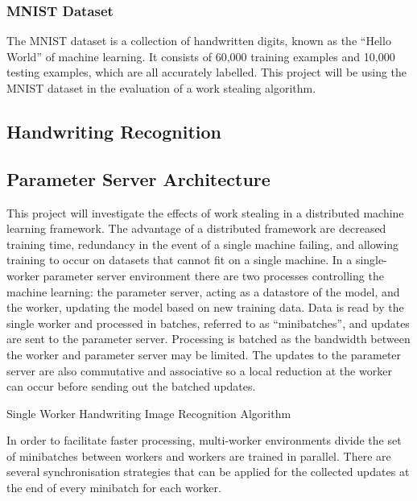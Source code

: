 \documentclass[12pt]{article}
\begin{document}
\subsubsection{MNIST Dataset}
The MNIST dataset is a collection of handwritten digits, known as the ``Hello World'' of machine learning. It consists of 60,000 training examples and 10,000 testing examples, which are all accurately labelled. This project will be using the MNIST dataset in the evaluation of a work stealing algorithm.
\newline
\subsection{Handwriting Recognition}
\subsection{Parameter Server Architecture}
This project will investigate the effects of work stealing in a distributed machine learning framework. The advantage of a distributed framework are decreased training time, redundancy in the event of a single machine failing, and allowing training to occur on datasets that cannot fit on a single machine.
\newline
\newline
In a single-worker parameter server environment there are two processes controlling the machine learning: the parameter server, acting as a datastore of the model, and the worker, updating the model based on new training data. Data is read by the single worker and processed in batches, referred to as ``minibatches'', and updates are sent to the parameter server. Processing is batched as the bandwidth between the worker and parameter server may be limited. The updates to the parameter server are also commutative and associative so a local reduction at the worker can occur before sending out the batched updates.
\newline

\IncMargin{1em}
\begin{algorithm}[H]
 \BlankLine

 \caption{Single Worker Handwriting Image Recognition Algorithm}
 \label{SingleWorkerMachineLearningAlgorithm}
\end{algorithm}
\DecMargin{1em}
\medskip
In order to facilitate faster processing, multi-worker environments divide the set of minibatches between workers and workers are trained in parallel. There are several synchronisation strategies that can be applied for the collected updates at the end of every minibatch for each worker.
\end{document}
